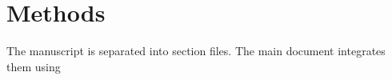 

\section{Methods}
The manuscript is separated into section files. 
The main document integrates them using
\begin{verbatim}

\end{verbatim}
